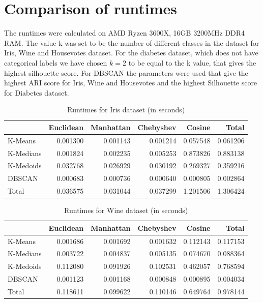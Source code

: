 \section{Comparison of runtimes}
The runtimes were calculated on AMD Ryzen 3600X, 16GB 3200MHz DDR4 RAM. The value k was set to be the number of different classes in the dataset for Iris, Wine and Housevotes dataset. For the diabetes dataset, which does not have categorical labels we have chosen $k=2$ to be equal to the k value, that gives the highest silhouette score. For DBSCAN the parameters were used that give the highest ARI score for Iris, Wine and Housevotes and the highest Silhouette score for Diabetes dataset. \\

\begin{table}[H]
	\begin{tabular}{lrrrr|r}
		\toprule
		{} &  Euclidean &  Manhattan &  Chebyshev &    Cosine &     Total \\
		\midrule
		K-Means   &   0.001300 &   0.001143 &   0.001214 &  0.057548 &  0.061206 \\
		K-Medians &   0.001824 &   0.002235 &   0.005253 &  0.873826 &  0.883138 \\
		K-Medoids &   0.032768 &   0.026929 &   0.030192 &  0.269327 &  0.359216 \\
		DBSCAN    &   0.000683 &   0.000736 &   0.000640 &  0.000805 &  0.002864 \\
		\midrule
		Total     &   0.036575 &   0.031044 &   0.037299 &  1.201506 &  1.306424 \\
		\bottomrule
		
	\end{tabular}
	\caption{Runtimes for Iris dataset (in seconds)}
\end{table}


\begin{table}[H]
	\begin{tabular}{lrrrr|r}
		\toprule
		{} &  Euclidean &  Manhattan &  Chebyshev &    Cosine &     Total \\
		\midrule
		K-Means   &   0.001686 &   0.001692 &   0.001632 &  0.112143 &  0.117153 \\
		K-Medians &   0.003722 &   0.004837 &   0.005135 &  0.074670 &  0.088364 \\
		K-Medoids &   0.112080 &   0.091926 &   0.102531 &  0.462057 &  0.768594 \\
		DBSCAN    &   0.001123 &   0.001168 &   0.000848 &  0.000895 &  0.004034 \\
		\midrule
		Total     &   0.118611 &   0.099622 &   0.110146 &  0.649764 &  0.978144 \\
		\bottomrule
		
	\end{tabular} 
	\caption{Runtimes for Wine dataset (in seconds)}
\end{table}


